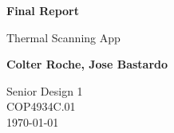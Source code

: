 \begin{titlepage}
    \begin{center}
        \vspace*{1cm}
            
        \Huge
        \textbf{Final Report}
            
        \vspace{0.5cm}
        \LARGE
        Thermal Scanning App
            
        \vspace{1.5cm}
            
        \textbf{Colter Roche, Jose Bastardo}
            
        \vfill
          
        \Large
        Senior Design 1\\
        COP4934C.01\\
        \today
            
    \end{center}
\end{titlepage}